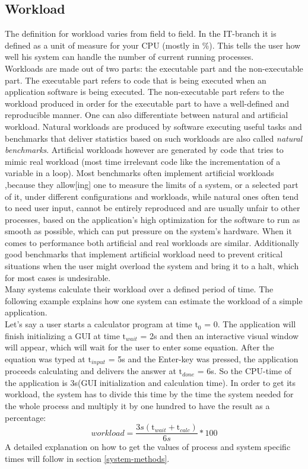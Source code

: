 \subsection{Workload}
The definition for workload varies from field to field. In the IT-branch it is defined as a unit of measure for your CPU (mostly in \%). This tells the user how well his system can handle the number of current running processes.\\
Workloads are made out of two parts: the executable part and the non-executable part. The executable part refers to code that is being executed when an application software is being executed. The non-executable part refers to the workload produced in order for the executable part to have \dq a well-defined and reproducible manner\dq{}. One can also differentiate between natural and artificial workload. Natural workloads are produced by software executing useful tasks and benchmarks that deliver statistics based on such workloads are also called \textit{natural benchmarks}. Artificial workloads however are generated by code that tries to mimic real workload (most time irrelevant code like the incrementation of a variable in a loop). Most benchmarks often implement artificial workloads ,because they \dq allow[ing] one to measure the limits of a system, or a selected part of it, under different configurations and workloads\dq{}, while natural ones often tend to need user input, cannot be entirely reproduced and are usually unfair to other processes, based on the application's high optimization for the software to run as smooth as possible, which can put pressure on the system's hardware\cite{Kounev2020}. When it comes to performance both artificial and real workloads are similar. Additionally good benchmarks that implement artificial workload need to prevent critical situations when the user might overload the system and bring it to a halt, which for most cases is undesirable.\\
Many systems calculate their workload over a defined period of time. The following example explains how one system can estimate the workload of a simple application.\\
Let's say a user starts a calculator program at time $\mathrm{t}_0$ = 0. The application will finish initializing a GUI at time $\mathrm{t}_{wait}$ = 2s and then an interactive visual window will appear, which will wait for the user to enter some equation.
After the equation was typed at $\mathrm{t}_{input}$ = 5s and the \dq Enter\dq{}-key was pressed, the application proceeds calculating and delivers the answer at $\mathrm{t}_{done}$ = 6s. So the CPU-time of the application is 3s(GUI initialization and calculation time). In order to get its workload, the system has to divide this time by the time the system needed for the whole process and multiply it by one hundred to have the result as a percentage:\\
\begin{equation}
workload =  \frac{3s(\mathrm{t}_{wait}+\mathrm{t}_{calc})}{6s}*100\end{equation}
A detailed explanation on how to get the values of process and system specific times will follow in section \ref{system-methods}.
